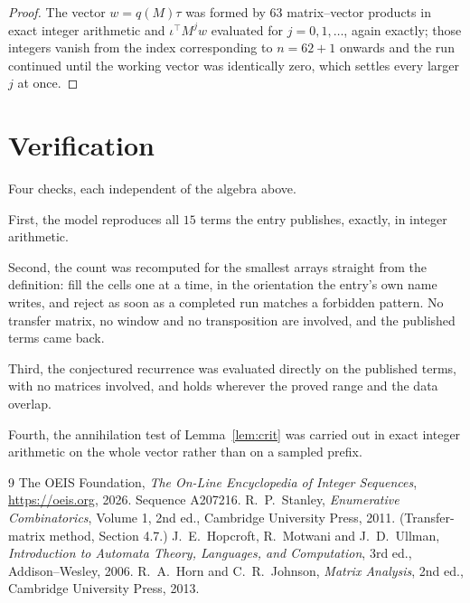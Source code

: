 \documentclass[11pt,a4paper]{article}
\theoremstyle{plain}
\theoremstyle{definition}
\begin{document}
\begin{proof}
The vector $w=q(M)\tau$ was formed by $63$ matrix--vector products in exact integer
arithmetic and $\iota^{\!\top}M^{j}w$ evaluated for $j=0,1,\dots$, again exactly; those
integers vanish from the index corresponding to $n=62+1$ onwards and the run continued
until the working vector was identically zero, which settles every larger $j$ at once.
\end{proof}

\section{Verification}

Four checks, each independent of the algebra above.

First, the model reproduces all $15$ terms the entry publishes, exactly, in integer
arithmetic.

Second, the count was recomputed for the smallest arrays straight from the definition: fill the
cells one at a time, in the orientation the entry's own name writes, and reject as soon as a
completed run matches a forbidden pattern. No transfer matrix, no window and no transposition
are involved, and the published terms came back.

Third, the conjectured recurrence was evaluated directly on the published terms, with no
matrices involved, and holds wherever the proved range and the data overlap.

Fourth, the annihilation test of Lemma~\ref{lem:crit} was carried out in exact integer
arithmetic on the whole vector rather than on a sampled prefix.

\begin{thebibliography}{9}
 The OEIS Foundation, \emph{The On-Line Encyclopedia of Integer
Sequences}, \url{https://oeis.org}, 2026. Sequence A207216.
 R.~P.~Stanley, \emph{Enumerative Combinatorics}, Volume 1, 2nd ed.,
Cambridge University Press, 2011. (Transfer-matrix method, Section 4.7.)
 J.~E.~Hopcroft, R.~Motwani and J.~D.~Ullman, \emph{Introduction to Automata
Theory, Languages, and Computation}, 3rd ed., Addison--Wesley, 2006.
 R.~A.~Horn and C.~R.~Johnson, \emph{Matrix Analysis}, 2nd ed., Cambridge
University Press, 2013.
\end{thebibliography}
\end{document}
